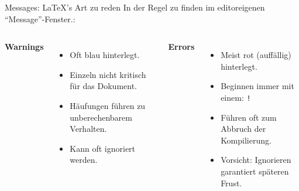 \begin{frame}{Messages: {\LaTeX}'s Art zu reden}
    In der Regel zu finden im editoreigenen ``Message''-Fenster.\vspace{10pt}:
    \begin{columns}

      {\color{blue}\textbf{Warnings}}
      \begin{itemize}
      \item<2-> Oft blau hinterlegt.
      \item<4-> Einzeln nicht kritisch für das Dokument.
      \item<7-> Häufungen führen zu unberechenbarem Verhalten.
      \item<7-> Kann oft ignoriert werden.
      \end{itemize}

      {\color{red}\textbf{Errors}}
      \begin{itemize}
      \item<3-> Meist rot (auffällig) hinterlegt.
      \item<3-> Beginnen immer mit einem: {\color{red}\texttt{!}}
      \item<5-> Führen oft zum Abbruch der Kompilierung.
      \item<8-> Vorsicht: Ignorieren garantiert späteren Frust.
      \end{itemize}
      
    \end{columns}

    \vspace{10pt}
\end{frame}

